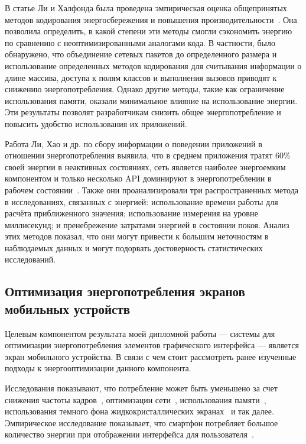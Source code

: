 \documentclass[a4paper,14pt]{extarticle} %
\begin{document}
	В статье  Ли и Халфонда была проведена эмпирическая оценка общепринятых методов кодирования энергосбережения и повышения производительности~\parencite{li2014investigation}. Она позволила определить, в какой степени эти методы смогли сэкономить энергию по сравнению с неоптимизированными аналогами кода. В частности, было обнаружено, что объединение сетевых пакетов до определенного размера и использование определенных методов кодирования для считывания информации о длине массива, доступа к полям классов и выполнения вызовов приводят к снижению энергопотребления. Однако другие методы, такие как ограничение использования памяти, оказали минимальное влияние на использование энергии. Эти результаты позволят разработчикам снизить общее энергопотребление и повысить удобство использования их приложений.
	
	Работа Ли, Хао и др. по сбору информации о поведении приложений в отношении энергопотребления выявила, что в среднем приложения тратят 60\% своей энергии в неактивных состояниях, сеть является наиболее энергоемким компонентом и только несколько API доминируют в энергопотреблении в рабочем состоянии~\parencite{li2014empirical}. Также они проанализировали три распространенных метода в исследованиях, связанных с энергией: использование времени работы для расчёта приближенного значения; использование измерения на уровне миллисекунд; и пренебрежение затратами энергией в состоянии покоя. Анализ этих методов показал, что они могут привести к большим неточностям в наблюдаемых данных и могут подорвать достоверность статистических исследований.
	
	\subsection{Оптимизация энергопотребления экранов мобильных устройств}
	
	Целевым компонентом результата моей дипломной работы --- системы для оптимизации энергопотребления элементов графического интерфейса --- является экран мобильного устройства. В связи с чем стоит рассмотреть ранее изученные подходы к энергооптимизации данного компонента.
	
	Исследования показывают, что потребление может быть уменьшено за счет снижения частоты кадров~\parencite{lee2018improving}, оптимизации сети~\parencite{tuysuz2019real}, использования памяти~\parencite{li2014investigation}, использования темного фона жидкокристаллических экранах~\parencite{утин2018адаптивное} и так далее. Эмпирическое исследование показывает, что смартфон потребляет большое количество энергии при отображении интерфейса для пользователя~\parencite{li2014empirical}. 
	
\end{document}
